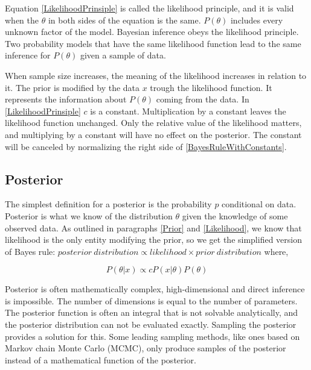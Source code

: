Equation \ref{LikelihoodPrinsiple} is called the likelihood principle, and it is valid when the $\theta$ in both sides of the equation is the same. $P(\theta)$ includes every unknown factor of the model. \cite{Robert2007TheBC} Bayesian inference obeys the likelihood principle. Two probability models that have the same likelihood function lead to the same inference for $P(\theta)$ given a sample of data.\cite{Gel2014BayesianDA}

When sample size increases, the meaning of the likelihood increases in relation to it. \cite{Mcelreath2015StatisticalRA} The prior is modified by the data $x$ trough the likelihood function. It represents the information about $P(\theta)$ coming from the data. In \ref{LikelihoodPrinsiple} $c$ is a constant. Multiplication by a constant leaves the likelihood function unchanged. Only the relative value of the likelihood matters, and multiplying by a constant will have no effect on the posterior. The constant will be canceled by normalizing the right side of \ref{BayesRuleWithConstants}.\cite{Box1973BayesianII}
 
\subsection{Posterior}\label{Posterior}
The simplest definition for a posterior is the probability $p$ conditional on data.\cite{Mcelreath2015StatisticalRA} Posterior is what we know of the distribution $\theta$ given the knowledge of some observed data. As outlined in paragraphs \ref{Prior} and \ref{Likelihood}, we know that likelihood is the only entity modifying the prior, so we get the simplified version of Bayes rule: $posterior\ distribution \propto likelihood \times prior\ distribution$ where,

\begin{equation}\label{BayesRuleWithConstants}
P(\theta|x) \propto cP(x|\theta)P(\theta)
\end{equation}\cite{Box1973BayesianII}

Posterior is often mathematically complex, high-dimensional and direct inference is impossible. The number of dimensions is equal to the number of parameters. The posterior function is often an integral that is not solvable analytically, and the posterior distribution can not be evaluated exactly. Sampling the posterior provides a solution for this.\cite{vandeSchoot2020BayesianSA} Some leading sampling methods, like ones based on Markov chain Monte Carlo (MCMC), only produce samples of the posterior instead of a mathematical function of the posterior.\cite{Mcelreath2015StatisticalRA}

